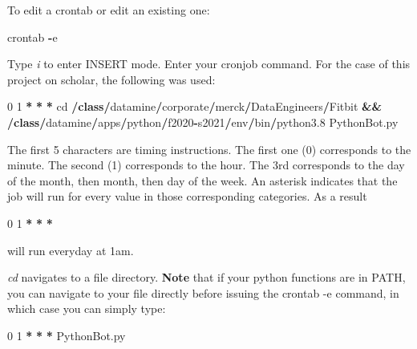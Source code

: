 \documentclass[]{book}
\newenvironment{Shaded}{\begin{snugshade}}{\end{snugshade}}
\newcommand{\KeywordTok}[1]{\textcolor[rgb]{0.13,0.29,0.53}{\textbf{#1}}}
\newcommand{\DecValTok}[1]{\textcolor[rgb]{0.00,0.00,0.81}{#1}}
\newcommand{\FloatTok}[1]{\textcolor[rgb]{0.00,0.00,0.81}{#1}}
\newcommand{\OperatorTok}[1]{\textcolor[rgb]{0.81,0.36,0.00}{\textbf{#1}}}
\newcommand{\BuiltInTok}[1]{#1}
\newcommand{\NormalTok}[1]{#1}
\begin{document}
To edit a crontab or edit an existing one:

\begin{Shaded}
\begin{Highlighting}[]
\NormalTok{crontab }\OperatorTok{-}\NormalTok{e}
\end{Highlighting}
\end{Shaded}

Type \emph{i} to enter INSERT mode. Enter your cronjob command. For the
case of this project on scholar, the following was used:

\begin{Shaded}
\begin{Highlighting}[]
\DecValTok{0} \DecValTok{1} \OperatorTok{*} \OperatorTok{*} \OperatorTok{*}\NormalTok{ cd }\OperatorTok{/}\KeywordTok{class}\OperatorTok{/}\NormalTok{datamine}\OperatorTok{/}\NormalTok{corporate}\OperatorTok{/}\NormalTok{merck}\OperatorTok{/}\NormalTok{DataEngineers}\OperatorTok{/}\NormalTok{Fitbit }\OperatorTok{&&} \OperatorTok{/}\KeywordTok{class}\OperatorTok{/}\NormalTok{datamine}\OperatorTok{/}\NormalTok{apps}\OperatorTok{/}\NormalTok{python}\OperatorTok{/}\NormalTok{f2020}\OperatorTok{-}\NormalTok{s2021}\OperatorTok{/}\NormalTok{env}\OperatorTok{/}\BuiltInTok{bin}\OperatorTok{/}\NormalTok{python3}\FloatTok{.8}\NormalTok{ PythonBot.py}
\end{Highlighting}
\end{Shaded}

The first 5 characters are timing instructions. The first one (0)
corresponds to the minute. The second (1) corresponds to the hour. The
3rd corresponds to the day of the month, then month, then day of the
week. An asterisk indicates that the job will run for every value in
those corresponding categories. As a result

\begin{Shaded}
\begin{Highlighting}[]
\DecValTok{0} \DecValTok{1} \OperatorTok{*} \OperatorTok{*} \OperatorTok{*} 
\end{Highlighting}
\end{Shaded}

will run everyday at 1am.

\emph{cd} navigates to a file directory. \textbf{Note} that if your
python functions are in PATH, you can navigate to your file directly
before issuing the crontab -e command, in which case you can simply
type:

\begin{Shaded}
\begin{Highlighting}[]
\DecValTok{0} \DecValTok{1} \OperatorTok{*} \OperatorTok{*} \OperatorTok{*}\NormalTok{ PythonBot.py}
\end{Highlighting}
\end{Shaded}
\end{document}
